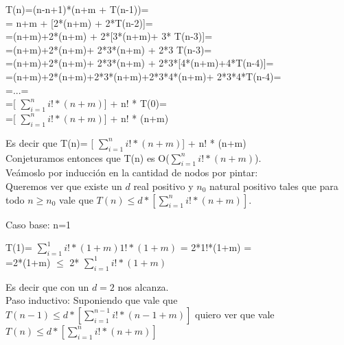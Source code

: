 \begin{centering}
T(n)=(n-n+1)*(n+m + T(n-1))=\\
= n+m + [2*(n+m) + 2*T(n-2)]=\\
=(n+m)+2*(n+m) + 2*[3*(n+m)+ 3* T(n-3)]=\\
=(n+m)+2*(n+m)+ 2*3*(n+m) + 2*3 T(n-3)=\\
=(n+m)+2*(n+m)+ 2*3*(n+m) + 2*3*[4*(n+m)+4*T(n-4)]=\\
=(n+m)+2*(n+m)+2*3*(n+m)+2*3*4*(n+m)+ 2*3*4*T(n-4)=\\
=...=\\
=[ $\sum_{i=1}^{n} i! * (n+m) $] + n! * T(0)= \\
=[ $\sum_{i=1}^{n} i! * (n+m) $] + n! * (n+m)\\
\end{centering}


\indent Es decir que T(n)= [ $\sum_{i=1}^{n} i! * (n+m) $] + n! * (n+m)\\

\indent Conjeturamos entonces que T(n) es O($\sum_{i=1}^{n} i! * (n+m) $).\\

\indent Veámoslo por inducción en la cantidad de nodos por pintar:\\

\indent Queremos ver que existe un $d$ real positivo y $n_{0}$ natural positivo tales que para todo $n\geq n_{0}$ vale que $T(n) \leq d * [\sum_{i=1}^{n} i! * (n+m)] $.

\indent Caso base: n=1 \\

\begin{center}
T(1)= $\sum_{i=1}^{1} i! * (1+m)  1! * (1+m) $ = 2*1!*(1+m) =\\
=2*(1+m) $\leq$ 2*  $\sum_{i=1}^{1} i! * (1+m)$ \\
\end{center}

\indent Es decir que con un $d=2$ nos alcanza.\\


\indent Paso inductivo: Suponiendo que vale que $T(n-1) \leq d * [\sum_{i=1}^{n-1} i! * (n-1+m)] $ quiero ver que vale $T(n) \leq d * [\sum_{i=1}^{n} i! * (n+m)] $ \\


